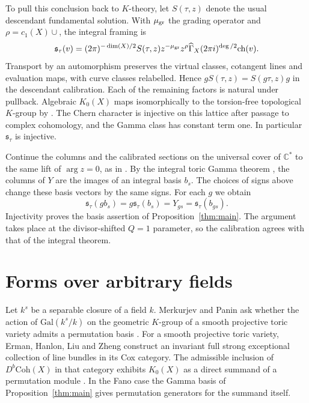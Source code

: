 \documentclass[11pt]{amsart}
\theoremstyle{definition}
\newcommand{\C}{\mathbb C}
\begin{document}
To pull this conclusion back to $K$-theory, let $S(\tau,z)$ denote the usual descendant fundamental solution. With $\mu_{\rm gr}$ the grading operator and $\rho=c_1(X)\cup{}$, the integral framing is
\[
 \mathfrak{s}_\tau(v)=(2\pi)^{-\dim(X)/2}S(\tau,z)z^{-\mu_{\rm gr}}z^\rho
 \widehat\Gamma_X(2\pi i)^{\deg/2}\mathrm{ch}(v).
\]
Transport by an automorphism preserves the virtual classes, cotangent lines and evaluation maps, with curve classes relabelled. Hence $g S(\tau,z)=S(g\tau,z)g$ in the descendant calibration. Each of the remaining factors is natural under pullback. Algebraic $K_0(X)$ maps isomorphically to the torsion-free topological $K$-group by \cite[Theorems~2.2, 4.1 and Remark~3.2]{San}. The Chern character is injective on this lattice after passage to complex cohomology, and the Gamma class has constant term one. In particular $\mathfrak{s}_\tau$ is injective.

Continue the columns and the calibrated sections on the universal cover of $\C^*$ to the same lift of $\arg z=0$, as in \cite[\S4.3]{GI}. By the integral toric Gamma theorem \cite[Theorem~6.4]{GI}, the columns of $Y$ are the images of an integral basis $b_s$. The choices of signs above change these basis vectors by the same signs. For each $g$ we obtain
\[
 \mathfrak{s}_\tau(g b_s)=g\mathfrak{s}_\tau(b_s)=Y_{gs}
                         =\mathfrak{s}_\tau(b_{gs}).
\]
Injectivity proves the basis assertion of Proposition~\ref{thm:main}. The argument takes place at the divisor-shifted $Q=1$ parameter, so the calibration agrees with that of the integral theorem.

\section{Forms over arbitrary fields}\label{sec:forms}
Let $k^s$ be a separable closure of a field $k$. Merkurjev and Panin ask whether the action of $\mathrm{Gal}(k^s/k)$ on the geometric $K$-group of a smooth projective toric variety admits a permutation basis \cite[question following Corollary~7.8]{MP}. For a smooth projective toric variety, Erman, Hanlon, Liu and Zheng construct an invariant full strong exceptional collection of line bundles in its Cox category. The admissible inclusion of $D^b\mathrm{Coh}(X)$ in that category exhibits $K_0(X)$ as a direct summand of a permutation module \cite[Theorem~A and Corollary~B]{EHLZ}. In the Fano case the Gamma basis of Proposition~\ref{thm:main} gives permutation generators for the summand itself.
\end{document}
